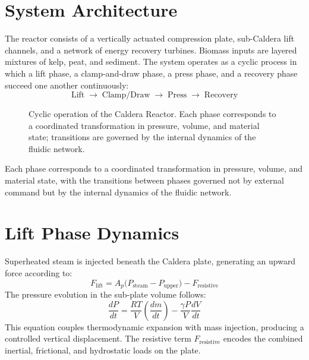 \documentclass[12pt, a4paper]{article}
\begin{document}
\section{System Architecture}

The reactor consists of a vertically actuated compression plate, sub-Caldera lift channels, and a network of energy recovery turbines. Biomass inputs are layered mixtures of kelp, peat, and sediment. The system operates as a cyclic process in which a lift phase, a clamp-and-draw phase, a press phase, and a recovery phase succeed one another continuously:
\[
\text{Lift} \;\rightarrow\; \text{Clamp/Draw} \;\rightarrow\; \text{Press} \;\rightarrow\; \text{Recovery}
\]
\begin{figure}[h]
\centering
{}
\caption{Cyclic operation of the Caldera Reactor. Each phase corresponds to a coordinated transformation in pressure, volume, and material state; transitions are governed by the internal dynamics of the fluidic network.}
\end{figure}

Each phase corresponds to a coordinated transformation in pressure, volume, and material state, with the transitions between phases governed not by external command but by the internal dynamics of the fluidic network.

\section{Lift Phase Dynamics}

Superheated steam is injected beneath the Caldera plate, generating an upward force according to:
\[
F_{\text{lift}} = A_p \bigl(P_{\text{steam}} - P_{\text{upper}}\bigr) - F_{\text{resistive}}
\]
The pressure evolution in the sub-plate volume follows:
\[
\frac{dP}{dt} = \frac{RT}{V} \left( \frac{dm}{dt} \right) - \frac{\gamma P}{V} \frac{dV}{dt}
\]
This equation couples thermodynamic expansion with mass injection, producing a controlled vertical displacement. The resistive term $F_{\text{resistive}}$ encodes the combined inertial, frictional, and hydrostatic loads on the plate.
\end{document}
